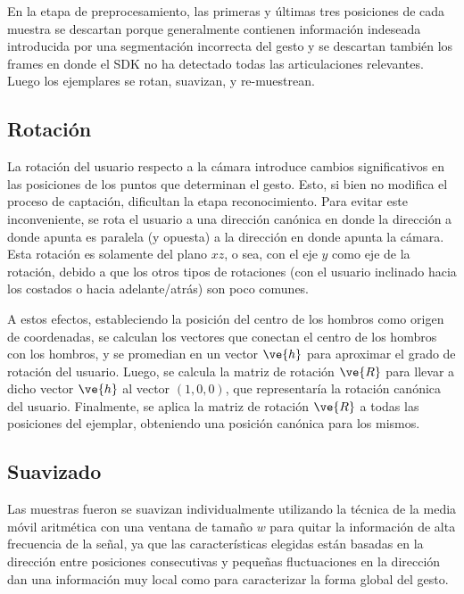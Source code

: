 
En la etapa de preprocesamiento, las primeras y últimas tres posiciones de cada muestra se descartan porque generalmente contienen información indeseada introducida por una segmentación incorrecta del gesto y se descartan también los frames en donde el SDK no ha detectado todas las articulaciones relevantes. Luego los ejemplares se rotan, suavizan, y re-muestrean.




\subsection{Rotación}

La rotación del usuario respecto a la cámara introduce cambios significativos en las posiciones de los puntos que determinan el gesto. Esto, si bien no modifica el proceso de captación, dificultan la etapa reconocimiento. Para evitar este inconveniente, se rota el usuario a una dirección canónica en donde la dirección a donde apunta es paralela (y opuesta) a la dirección en donde apunta la cámara. Esta rotación es solamente del plano $xz$, o sea, con el eje $y$ como eje de la rotación, debido a que los otros tipos de rotaciones (con el usuario inclinado hacia los costados o hacia adelante/atrás) son poco comunes.


A estos efectos, estableciendo la posición del centro de los hombros como origen de coordenadas, se calculan los vectores que conectan el centro de los hombros con los hombros, y se promedian en un vector $\ve{h}$ para aproximar el grado de rotación del usuario. Luego, se calcula la matriz de rotación $\ve{R}$ para llevar a dicho vector $\ve{h}$ al vector $(1,0,0)$, que representaría la rotación canónica del usuario. Finalmente, se aplica la matriz de rotación $\ve{R}$ a todas las posiciones del ejemplar, obteniendo una posición canónica para los mismos.

\subsection{Suavizado}
Las muestras fueron se suavizan individualmente utilizando la técnica de la media móvil aritmética con una ventana de tamaño $w$ para quitar la información de alta frecuencia de la señal, ya que las características elegidas están basadas en la dirección entre posiciones consecutivas y pequeñas fluctuaciones en la dirección dan una información muy local como para caracterizar la forma global del gesto.

